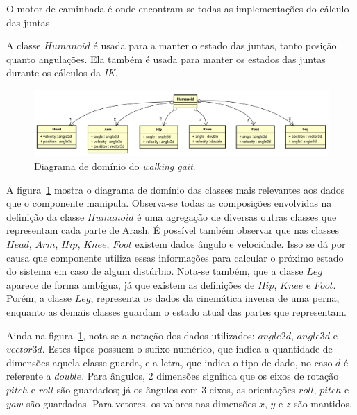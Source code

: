 O motor de caminhada é onde encontram-se todas as implementações do cálculo das juntas.

A classe $Humanoid$ é usada para a manter o estado das juntas, tanto posição quanto angulações. Ela também é usada para manter os estados das juntas durante os cálculos da \textit{IK}.

\begin{figure}[htb]
	\centering
	\includegraphics[scale=0.4]{imagens/svg/walkinggait-domain}
	\caption{Diagrama de domínio do \textit{walking gait}.}
	\label{fig:architecture:walkinggait:domain}
\end{figure}

A figura~\ref{fig:architecture:walkinggait:domain} mostra o diagrama de domínio das classes mais relevantes aos dados que o componente manipula. Observa-se todas as composições envolvidas na definição da classe $Humanoid$ é uma agregação de diversas outras classes que representam cada parte de Arash. É possível também observar que nas classes $Head$, $Arm$, $Hip$, $Knee$, $Foot$ existem dados ângulo e velocidade. Isso se dá por causa que componente utiliza essas informações para calcular o próximo estado do sistema em caso de algum distúrbio. Nota-se também, que a classe $Leg$ aparece de forma ambígua, já que existem as definições de $Hip$, $Knee$ e $Foot$. Porém, a classe $Leg$, representa os dados da cinemática inversa de uma perna, enquanto as demais classes guardam o estado atual das partes que representam.

Ainda na figura~\ref{fig:architecture:walkinggait:domain}, nota-se a notação dos dados utilizados: $angle2d$, $angle3d$ e $vector3d$. Estes tipos possuem o sufixo numérico, que indica a quantidade de dimensões aquela classe guarda, e a letra, que indica o tipo de dado, no caso $d$ é referente a $double$. Para ângulos, $2$ dimensões significa que os eixos de rotação $pitch$ e $roll$ são guardados; já os ângulos com $3$ eixos, as orientações $roll$, $pitch$ e $yaw$ são guardadas. Para vetores, os valores nas dimensões $x$, $y$ e $z$ são mantidos.

